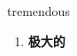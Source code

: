 
\begin{frame}
{\huge tremendous}
\begin{center}
\begin{enumerate}\Large
  \item \textbf{极大的}
\end{enumerate}
\end{center}
\end{frame}
